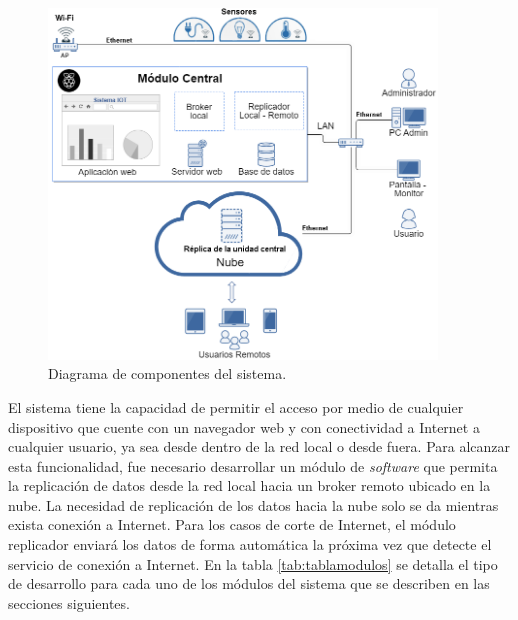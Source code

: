 \begin{figure}[htbp]
	\centering
	\includegraphics[width=0.92\textwidth]{./Figures/diagrama1.png}
	\caption{Diagrama de componentes del sistema.}

	\label{fig:diagrama1}
\end{figure}

El sistema tiene la capacidad de permitir el acceso por medio de cualquier dispositivo que cuente con un navegador web y con conectividad a Internet a cualquier usuario, ya sea desde dentro de la red local o desde fuera. Para alcanzar esta funcionalidad, fue necesario desarrollar un módulo de \emph{software} que permita la replicación de datos desde la red local hacia un broker remoto ubicado en la nube. La necesidad de replicación de los datos hacia la nube solo se da mientras exista conexión a Internet. Para los casos de corte de Internet, el módulo replicador enviará los datos de forma automática la próxima vez que detecte el servicio de conexión a Internet. En la tabla \ref{tab:tablamodulos} se detalla el tipo de desarrollo para cada uno de los módulos del sistema  que se describen en las secciones siguientes.

